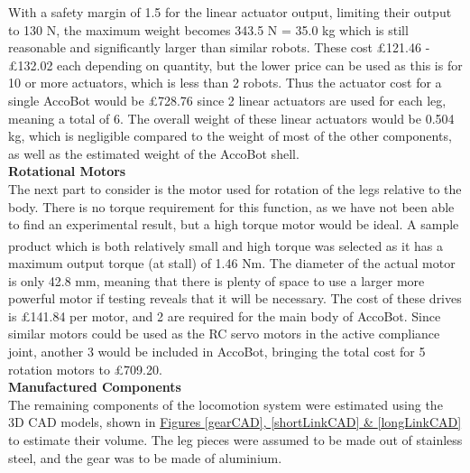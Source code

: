 \documentclass[11pt]{article}		%
\newcommand{\supercite}[1]{\textsuperscript{\cite{#1}}}		%
\begin{document}
			With a safety margin of 1.5 for the linear actuator output, limiting their output to 130 N, the maximum weight becomes 343.5 N = 35.0 kg which is still reasonable and significantly larger than similar robots.
			These cost £121.46 - £132.02 each depending on quantity, but the lower price can be used as this is for 10 or more actuators, which is less than 2 robots.
			Thus the actuator cost for a single AccoBot would be £728.76 since 2 linear actuators are used for each leg, meaning a total of 6.
			The overall weight of these linear actuators would be 0.504 kg, which is negligible compared to the weight of most of the other components, as well as the estimated weight of the AccoBot shell.
			\\
			\textbf{Rotational Motors}
			\\
			The next part to consider is the motor used for rotation of the legs relative to the body. 
			There is no torque requirement for this function, as we have not been able to find an experimental result, but a high torque motor would be ideal.
			A sample product which is both relatively small and high torque was selected\supercite{rsproRotation} as it has a maximum output torque (at stall) of 1.46 Nm.
			The diameter of the actual motor is only 42.8 mm, meaning that there is plenty of space to use a larger more powerful motor if testing reveals that it will be necessary.
			The cost of these drives is £141.84 per motor, and 2 are required for the main body of AccoBot.
			Since similar motors could be used as the RC servo motors in the active compliance joint, another 3 would be included in AccoBot, bringing the total cost for 5 rotation motors to £709.20.
			\\
			\textbf{Manufactured Components}
			\\
			The remaining components of the locomotion system were estimated using the 3D CAD models, shown in \hyperref[gearCAD]{Figures \ref*{gearCAD}, \ref*{shortLinkCAD} \& \ref*{longLinkCAD}} to estimate their volume.
			The leg pieces were assumed to be made out of stainless steel, and the gear was to be made of aluminium.
			\\
\end{document}
